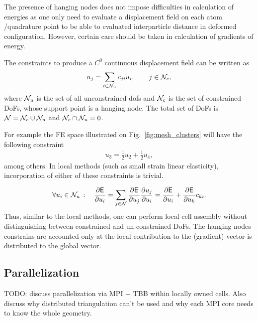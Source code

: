 \documentclass[a4paper,10pt]{article}
\newcommand{\reffig}[1]{Fig.~\ref{fig:#1}}
\def\msf  #1{           \mbox{\!\!      $\sf #1$}}
\def\mcl  #1{               {\cal #1}}
\begin{document}
The presence of hanging nodes does not impose difficulties in calculation of energies as one only need to evaluate a displacement field on each atom /quadrature point to be able to evaluated interparticle distance in deformed configuration. However, certain care should be taken in calculation of gradients of energy. 

The constraints to produce a $C^0$ continuous displacement field can be written as
\begin{align}
u_j = \sum_{i \in \mcl N_{u}} c_{ji} u_i, \qquad   j \in \mcl N_{c} ,
\end{align}
where  $\mcl N_{u}$ is the set of all unconstrained dofs and $\mcl N_c$ is the set of constrained DoFs,
whose support point is a hanging node. The total set of DoFs is $\mcl N = \mcl N_c \cup \mcl N_u$ and $\mcl N_c \cap \mcl N_u = 0$.

For example the FE space illustrated on \reffig{mesh_clusters} will have the following constraint
\begin{align}
u_3 = \frac{1}{2} u_2 + \frac{1}{2} u_4,
\end{align}
among others. 
In local methods (such as small strain linear elasticity), incorporation of either of these constraints is trivial.


\begin{align}
\begin{split}
\forall u_i \in \mcl N_{u} \,: \quad 
\frac{\partial \msf E }{\partial u_i} 
= \sum_{j \in \mcl N} \frac{\partial \msf E }{\partial u_j} \frac{\partial u_j }{\partial u_i}  
= \frac{\partial \msf E }{\partial u_i} + \frac{\partial \msf E }{\partial u_k} c_{ki} .
\end{split}
\end{align}
Thus, similar to the local methods, one can perform local cell assembly without distinguishing between constrained and un-constrained DoFs.
The hanging nodes constrains are accounted only at the local contribution to the (gradient) vector is distributed to the global vector.

\subsection{Parallelization}


{\color{red}TODO}: discuss parallelization via MPI + TBB within locally owned cells. Also discuss why distributed triangulation can't be used and why each MPI core needs to know the whole geometry.
\end{document}

